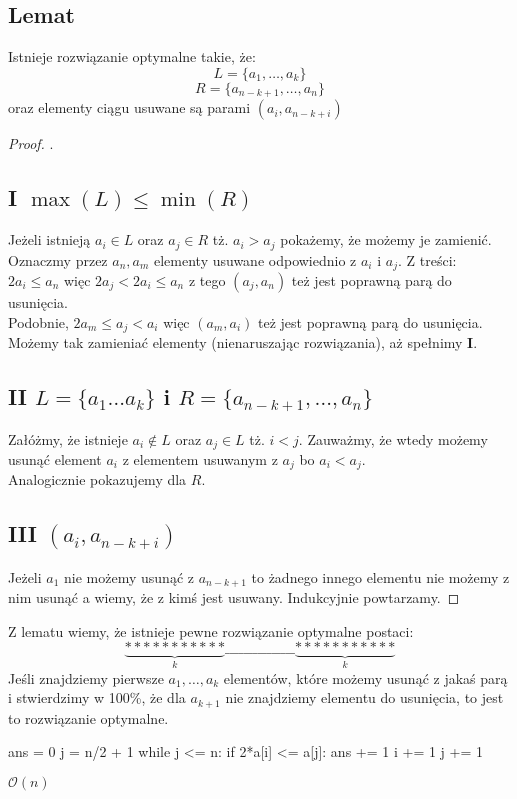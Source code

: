 \documentclass{article}
\begin{document}
\subsection*{Lemat}
Istnieje rozwiązanie optymalne takie, że:
$$L = \{a_1, \ldots, a_k\}$$
$$R = \{a_{n-k+1}, \ldots, a_n\}$$
oraz elementy ciągu usuwane są parami $(a_i, a_{n-k+i})$
\begin{proof}.
\subsection*{I \quad $\max(L) \leq \min(R)$}
Jeżeli istnieją $a_i \in L$ oraz $a_j \in R$ tż. $a_i > a_j$ pokażemy, że możemy je zamienić. Oznaczmy przez $a_n, a_m$ elementy usuwane odpowiednio z $a_i$ i $a_j$. Z treści:\\
$2a_i \leq a_n$ więc $2a_j < 2a_i \leq a_n$ z tego $(a_j, a_n)$ też jest poprawną parą do usunięcia.\\
Podobnie, $2a_m \leq a_j < a_i$ więc $(a_m, a_i)$ też jest poprawną parą do usunięcia.\\
Możemy tak zamieniać elementy (nienaruszając rozwiązania), aż spełnimy \textbf{I}.
\subsection*{II \quad $L = \{a_1 \ldots a_k\}$ i $R = \{a_{n-k+1}, \ldots, a_n\}$}
Załóżmy, że istnieje $a_i \notin L$ oraz $a_j \in L$ tż. $i < j$.
Zauważmy, że wtedy możemy usunąć element $a_i$ z elementem usuwanym z $a_j$ bo $a_i < a_j$.\\
Analogicznie pokazujemy dla $R$.
\subsection*{III \quad $(a_i, a_{n-k+i})$}
Jeżeli $a_1$ nie możemy usunąć z $a_{n-k+1}$ to żadnego innego elementu nie możemy z nim usunąć a wiemy, że z kimś jest usuwany. Indukcyjnie powtarzamy.
\end{proof}
Z lematu wiemy, że istnieje pewne rozwiązanie optymalne postaci:\\
$$
\underbrace{***********}_k\_\_\_\_\_\_\_\_\_\_\_\_\_\_\_\underbrace{***********}_k
$$
Jeśli znajdziemy pierwsze $a_1,\ldots,a_k$ elementów, które możemy usunąć z jakaś parą i stwierdzimy w 100\%, że dla $a_{k+1}$ nie znajdziemy elementu do usunięcia, to jest to rozwiązanie optymalne.
\begin{python}
ans = 0
j = n/2 + 1
while j <= n:
    if 2*a[i] <= a[j]:
        ans += 1
        i += 1
    j += 1
\end{python}
$\mathcal{O}(n)$
\end{document}
